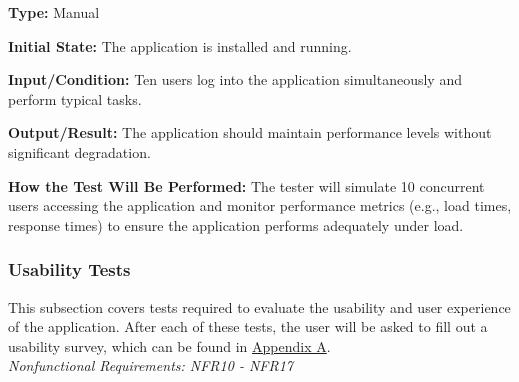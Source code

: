 \documentclass[12pt, titlepage]{article}
\begin{document}
\begin{enumerate}
\textbf{Type:} Manual
					
\textbf{Initial State:} The application is installed and running.
					
\textbf{Input/Condition:} Ten users log into the application simultaneously and
perform typical tasks.
					
\textbf{Output/Result:} The application should maintain performance levels
without significant degradation.
					
\textbf{How the Test Will Be Performed:} The tester will simulate 10 concurrent
users accessing the application and monitor performance metrics (e.g., load
times, response times) to ensure the application performs adequately under load.

\end{enumerate}

\subsubsection{Usability Tests}

This subsection covers tests required to evaluate the usability and user
experience of the application. After each of these tests, the user will be asked
to fill out a usability survey, which can be found in \hyperref[appx.a]{Appendix
A}.\\

\textit{Nonfunctional Requirements: NFR10 - NFR17}
\end{document}
